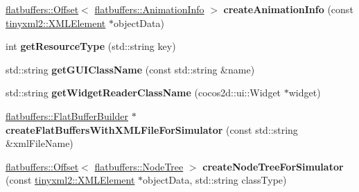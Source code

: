 \begin{DoxyCompactItemize}
\item 
\mbox{\label{classcocostudio_1_1FlatBuffersSerialize_a9218eb75bb501a03432acfc9841e5080}} 
\hyperlink{structflatbuffers_1_1Offset}{flatbuffers\+::\+Offset}$<$ \hyperlink{structflatbuffers_1_1AnimationInfo}{flatbuffers\+::\+Animation\+Info} $>$ {\bfseries create\+Animation\+Info} (const \hyperlink{classtinyxml2_1_1XMLElement}{tinyxml2\+::\+X\+M\+L\+Element} $\ast$object\+Data)
\item 
\mbox{\label{classcocostudio_1_1FlatBuffersSerialize_ab7fc3e7a3324471aabff437742d1a803}} 
int {\bfseries get\+Resource\+Type} (std\+::string key)
\item 
\mbox{\label{classcocostudio_1_1FlatBuffersSerialize_ada37737d77830d3ccc1580c5785a5e3c}} 
std\+::string {\bfseries get\+G\+U\+I\+Class\+Name} (const std\+::string \&name)
\item 
\mbox{\label{classcocostudio_1_1FlatBuffersSerialize_a6c758cc8ccab21b923efdc18ae1e4f10}} 
std\+::string {\bfseries get\+Widget\+Reader\+Class\+Name} (cocos2d\+::ui\+::\+Widget $\ast$widget)
\item 
\mbox{\label{classcocostudio_1_1FlatBuffersSerialize_aff482704586f3f9125fc9b6e372cbe18}} 
\hyperlink{classflatbuffers_1_1FlatBufferBuilder}{flatbuffers\+::\+Flat\+Buffer\+Builder} $\ast$ {\bfseries create\+Flat\+Buffers\+With\+X\+M\+L\+File\+For\+Simulator} (const std\+::string \&xml\+File\+Name)
\item 
\mbox{\label{classcocostudio_1_1FlatBuffersSerialize_a90ff00a6ede726428b7dfabdacdc7397}} 
\hyperlink{structflatbuffers_1_1Offset}{flatbuffers\+::\+Offset}$<$ \hyperlink{structflatbuffers_1_1NodeTree}{flatbuffers\+::\+Node\+Tree} $>$ {\bfseries create\+Node\+Tree\+For\+Simulator} (const \hyperlink{classtinyxml2_1_1XMLElement}{tinyxml2\+::\+X\+M\+L\+Element} $\ast$object\+Data, std\+::string class\+Type)
\item 
\mbox{\label{classcocostudio_1_1FlatBuffersSerialize_a8ea366a42ef75a98900373032a4164fe}} 

\end{DoxyCompactItemize}
